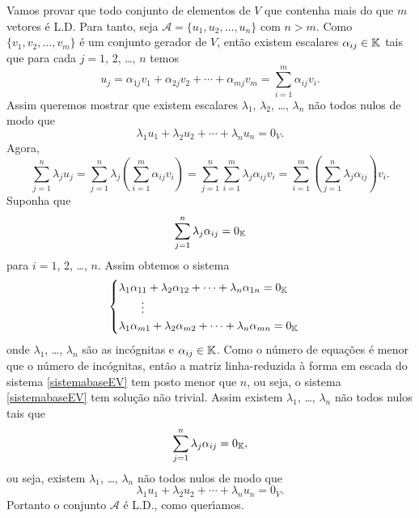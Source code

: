 \begin{prova}
	Vamos provar que todo conjunto de elementos de $V$ que contenha mais do que $m$ vetores \'e L.D. Para tanto, seja $\mathcal{A} = \{u_1, u_2, \dots, u_n\}$ com $n > m$. Como $\{v_1, v_2, \dots, v_m\}$ \'e um conjunto gerador de $V$, ent\~ao existem escalares $\alpha_{ij} \in \mathbb{K}$ tais que para cada $j = 1$, 2, \dots, $n$ temos
	\[
		u_j = \alpha_{1j}v_1 + \alpha_{2j}v_2 + \cdots + \alpha_{mj}v_m = \sum_{i = 1}^m\alpha_{ij}v_i.
	\]
	Assim queremos mostrar que existem escalares $\lambda_1$, $\lambda_2$, \dots, $\lambda_n$ n\~ao todos nulos de modo que
	\[
		\lambda_1 u_1 + \lambda_2 u_2 + \cdots + \lambda_n u_n = 0_V.
	\]
	Agora,
	\[
		\sum_{j = 1}^n\lambda_ju_j = \sum_{j = 1}^n\lambda_j\left(\sum_{i = 1}^m\alpha_{ij}v_i\right) = \sum_{j = 1}^n\sum_{i = 1}^m\lambda_j\alpha_{ij}v_i = \sum_{i = 1}^m\left(\sum_{j = 1}^n\lambda_j\alpha_{ij}\right)v_i.
	\]
	Suponha que
	\[
		\sum_{j = 1}^n\lambda_j\alpha_{ij} = 0_{\mathbb{K}}
	\]
	para $i = 1$, 2, \dots, $n$. Assim obtemos o sistema
	\begin{equation}\label{sistemabaseEV}
		\begin{cases}
			\lambda_1\alpha_{11} + \lambda_2\alpha_{12} + \cdots + \lambda_n\alpha_{1n} = 0_{\mathbb{K}}\\
			\qquad \vdots\\
			\lambda_1\alpha_{m1} + \lambda_2\alpha_{m2} + \cdots + \lambda_n\alpha_{mn} = 0_{\mathbb{K}}\\
		\end{cases}
	\end{equation}
	onde $\lambda_1$, \dots, $\lambda_n$ s\~ao as inc\'ognitas e $\alpha_{ij} \in \mathbb{K}$. Como o n\'umero de equa\c{c}\~oes \'e menor que o n\'umero de inc\'ognitas, ent\~ao a matriz linha-reduzida \`a forma em escada do sistema \eqref{sistemabaseEV} tem posto menor que $n$, ou seja, o sistema \eqref{sistemabaseEV} tem solu\c{c}\~ao n\~ao trivial. Assim existem $\lambda_1$, \dots, $\lambda_n$ n\~ao todos nulos tais que
	\[
		\sum_{j = 1}^n\lambda_j\alpha_{ij} = 0_{\mathbb{K}},
	\]
	ou seja, existem $\lambda_1$, \dots, $\lambda_n$ n\~ao todos nulos de modo que
	\[
		\lambda_1 u_1 + \lambda_2 u_2 + \cdots + \lambda_n u_n = 0_V.
	\]
	Portanto o conjunto $\mathcal{A}$ \'e L.D., como quer{\'\i}amos.
\end{prova}

